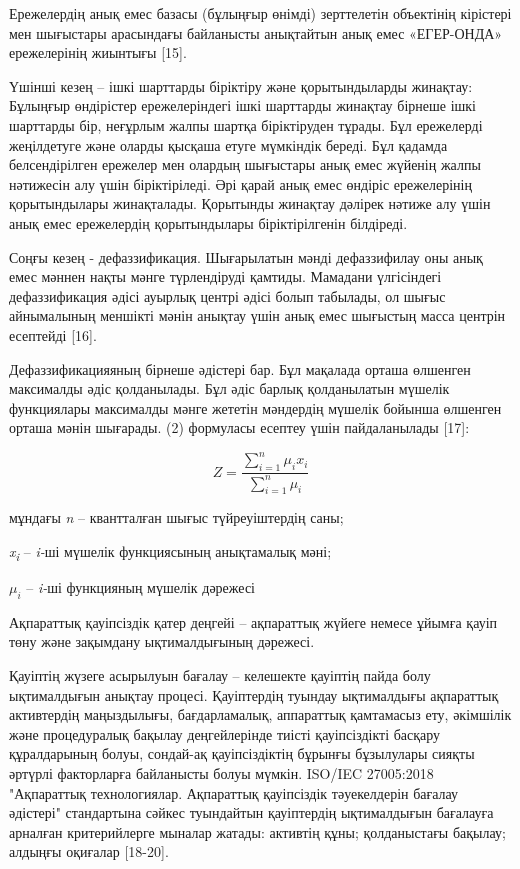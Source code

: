 \begin{multicols}{2}
Ережелердің анық емес базасы (бұлыңғыр өнімді) зерттелетін объектінің
кірістері мен шығыстары арасындағы байланысты анықтайтын анық емес
«ЕГЕР-ОНДА» ережелерінің жиынтығы {[}15{]}.

Үшінші кезең -- ішкі шарттарды біріктіру және қорытындыларды жинақтау:
Бұлыңғыр өндірістер ережелеріндегі ішкі шарттарды жинақтау бірнеше ішкі
шарттарды бір, неғұрлым жалпы шартқа біріктіруден тұрады. Бұл ережелерді
жеңілдетуге және оларды қысқаша етуге мүмкіндік береді. Бұл қадамда
белсендірілген ережелер мен олардың шығыстары анық емес жүйенің жалпы
нәтижесін алу үшін біріктіріледі. Әрі қарай анық емес өндіріс
ережелерінің қорытындылары жинақталады. Қорытынды жинақтау дәлірек
нәтиже алу үшін анық емес ережелердің қорытындылары біріктірілгенін
білдіреді.

Соңғы кезең - дефаззификация. Шығарылатын мәнді дефаззифилау оны анық
емес мәннен нақты мәнге түрлендіруді қамтиды. Мамадани үлгісіндегі
дефаззификация әдісі ауырлық центрі әдісі болып табылады, ол шығыс
айнымалының меншікті мәнін анықтау үшін анық емес шығыстың масса центрін
есептейді {[}16{]}.

Дефаззификацияяның бірнеше әдістері бар. Бұл мақалада орташа өлшенген
максималды әдіс қолданылады. Бұл әдіс барлық қолданылатын мүшелік
функциялары максималды мәнге жететін мәндердің мүшелік бойынша өлшенген
орташа мәнін шығарады. (2) формуласы есептеу үшін пайдаланылады
{[}17{]}:

\begin{equation}
    Z = \frac{\sum_{i = 1}^{n}{\mu_{i}x_{i}}}{\sum_{i = 1}^{n}\mu_{i}}
\end{equation}

мұндағы \emph{n} -- квантталған шығыс түйреуіштердің саны;

\emph{x\textsubscript{i}} -- \emph{i-}ші мүшелік функциясының
анықтамалық мәні;

\(\mu_{i}\) -- \emph{i-}ші функцияның мүшелік дәрежесі

Ақпараттық қауіпсіздік қатер деңгейі -- ақпараттық жүйеге немесе ұйымға
қауіп төну және зақымдану ықтималдығының дәрежесі.

Қауіптің жүзеге асырылуын бағалау -- келешекте қауіптің пайда болу
ықтималдығын анықтау процесі. Қауіптердің туындау ықтималдығы ақпараттық
активтердің маңыздылығы, бағдарламалық, аппараттық қамтамасыз ету,
әкімшілік және процедуралық бақылау деңгейлерінде тиісті қауіпсіздікті
басқару құралдарының болуы, сондай-ақ қауіпсіздіктің бұрынғы бұзылулары
сияқты әртүрлі факторларға байланысты болуы мүмкін. ISO/IEC 27005:2018
"Ақпараттық технологиялар. Ақпараттық қауіпсіздік тәуекелдерін бағалау
әдістері" стандартына сәйкес туындайтын қауіптердің ықтималдығын
бағалауға арналған критерийлерге мыналар жатады: активтің құны;
қолданыстағы бақылау; алдыңғы оқиғалар {[}18-20{]}.


\end{multicols}
